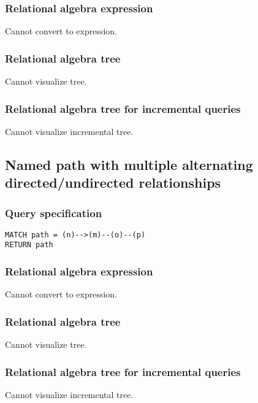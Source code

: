 \subsubsection*{Relational algebra expression}

Cannot convert to expression.

\subsubsection*{Relational algebra tree}

Cannot visualize tree.

\subsubsection*{Relational algebra tree for incremental queries}

Cannot visualize incremental tree.

\subsection{Named path with multiple alternating directed/undirected relationships}

\subsubsection*{Query specification}

\begin{lstlisting}
MATCH path = (n)-->(m)--(o)--(p)
RETURN path
\end{lstlisting}

\subsubsection*{Relational algebra expression}

Cannot convert to expression.

\subsubsection*{Relational algebra tree}

Cannot visualize tree.

\subsubsection*{Relational algebra tree for incremental queries}

Cannot visualize incremental tree.

